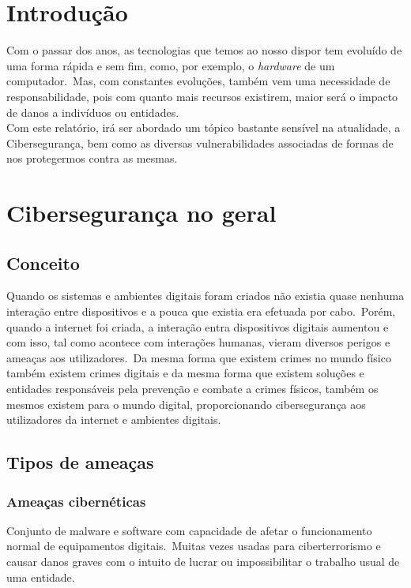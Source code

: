 \documentclass{report}
\begin{document}
\tableofcontents
\listoftables     %
\listoffigures    %


\clearpage
{}

\chapter*{Introdução}
\label{ch:introducao}

Com o passar dos anos, as tecnologias que temos ao nosso dispor tem evoluído de uma forma rápida e sem fim, como, por exemplo, o \textit{hardware} de um computador.\ Mas, com constantes evoluções, também vem uma necessidade de responsabilidade, pois com quanto mais recursos existirem, maior será o impacto de danos a indivíduos ou entidades.\\

Com este relatório, irá ser abordado um tópico bastante sensível na atualidade, a Cibersegurança, bem como as diversas vulnerabilidades associadas de formas de nos protegermos contra as mesmas.

\chapter{Cibersegurança no geral}
\label{ch:ciberseguranca-no-geral}
\section{Conceito}
Quando os sistemas e ambientes digitais foram criados não existia quase nenhuma interação entre dispositivos e a pouca que existia era efetuada por cabo.\ Porém, quando a internet foi criada, a interação entra dispositivos digitais aumentou e com isso, tal como acontece com interações humanas, vieram diversos perigos e ameaças aos utilizadores.\ Da mesma forma que existem crimes no mundo físico também existem crimes digitais e da mesma forma que existem soluções e entidades responsáveis pela prevenção e combate a crimes físicos, também os mesmos existem para o mundo digital, proporcionando cibersegurança aos utilizadores da internet e ambientes digitais.

\section{Tipos de ameaças}
\label{sec:ameacas}
\subsection{Ameaças cibernéticas}
Conjunto de malware e software com capacidade de afetar o funcionamento normal de equipamentos digitais.\ Muitas vezes usadas para ciberterrorismo e causar danos graves com o intuito de lucrar ou impossibilitar o trabalho usual de uma entidade.\\
\end{document}

